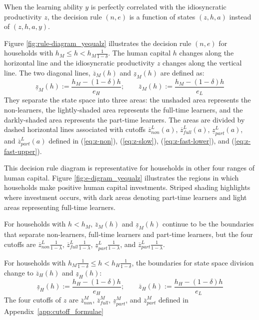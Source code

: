 \documentclass[12pt]{article}
\begin{document}
When the learning ability $y$ is perfectly correlated with the idiosyncratic productivity $z$, the decision rule $(n,e)$ is a function of states $(z,h,a)$ instead of $(z,h,a,y)$.


Figure \ref{fig:rule-diagram_yequalz} illustrates the decision rule $(n,e)$ for households with $h_M \leq h<h_M\frac{1}{1-\delta}$. The human capital $h$ changes along the horizontal line and the idiosyncratic productivity $z$ changes along the vertical line. The two diagonal lines, $\overline{z}_M(h)$ and $\underline{z}_M(h)$ are defined as:
\begin{equation}\label{eq:zm}
    \underline{z}_M(h):=\frac{h_M-(1-\delta)h}{e_H}; \qquad \overline{z}_M(h):=\frac{h_M-(1-\delta)h}{e_L} 
\end{equation}
They separate the state space into three areas: the unshaded area represents the non-learners, the lightly-shaded area represents the full-time learners, and the darkly-shaded area represents the part-time learners. The areas are divided by dashed horizontal lines associated with cutoffs $\overline{z}^L_{non}(a)$, $\overline{z}^L_{full}(a)$, $\underline{z}^L_{part}(a)$, and $\overline{z}^L_{part}(a)$ defined in (\ref{eq:z-non}), (\ref{eq:z-slow}), (\ref{eq:z-fast-lower}), and (\ref{eq:z-fast-upper}).


This decision rule diagram is representative for households in other four ranges of human capital. Figure \ref{fig:e-digram_yequalz} illustrates the regions in which households make positive human capital investments. Striped shading highlights where investment occurs, with dark areas denoting part-time learners and light areas representing full-time learners. 

For households with $h<h_M$, $\overline{z}_M(h)$ and $\underline{z}_M(h)$ continue to be the boundaries that separate non-learners, full-time learners and part-time learners, but the four cutoffs are $\overline{z}^L_{non}\frac{1}{1-\lambda}$, $\overline{z}^L_{full}\frac{1}{1-\lambda}$, $\underline{z}^L_{part}\frac{1}{1-\lambda}$, and $\overline{z}^L_{part}\frac{1}{1-\lambda}$.

For households with $h_M\frac{1}{1-\delta} \leq h<h_H\frac{1}{1-\delta}$, the boundaries for state space division change to $\overline{z}_H(h)$ and $\underline{z}_H(h)$:
\begin{equation}\label{eq:zh}
    \underline{z}_H(h):=\frac{h_H-(1-\delta)h}{e_H}; \qquad \overline{z}_H(h):=\frac{h_H-(1-\delta)h}{e_L} 
\end{equation}
The four cutoffs of $z$ are $\overline{z}^M_{non}$, $\overline{z}^M_{full}$, $\underline{z}^M_{part}$, and $\overline{z}^M_{part}$ defined in Appendix~\ref{app:cutoff_formulae}
\end{document}
